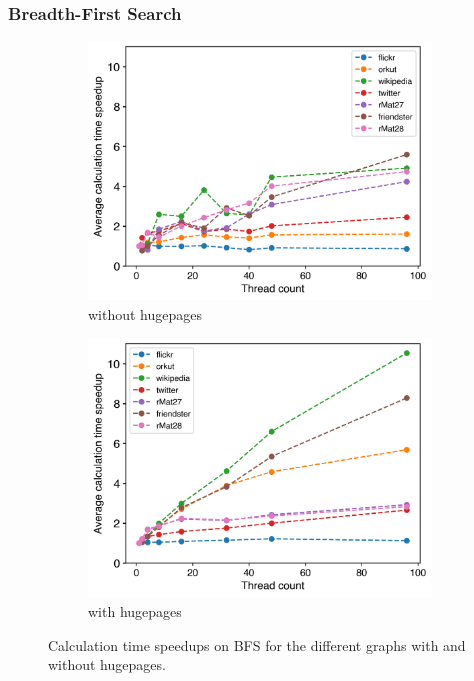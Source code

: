 \subsubsection{Breadth-First Search}
\begin{figure}
	\hfil
	\begin{subfigure}{0.32\textwidth}
		\includegraphics[width=\linewidth]{../../plots/singleNodeBFSGaloisThreads.png}
		\caption{without hugepages}
		\label{fig:galoisSpeedupBFS_noHP}
	\end{subfigure}
	\hfil
	\begin{subfigure}{0.32\textwidth}
		\includegraphics[width=\linewidth]{../../plots/singleNodeBFSGaloisHPThreads.png}
		\caption{with hugepages}
		\label{fig:galoisSpeedupBFS_HP}
	\end{subfigure}
	\hfil
	\caption{Calculation time speedups on BFS for the different graphs with and without hugepages.}
	\label{fig:galoisSpeedupBFS}
\end{figure}

